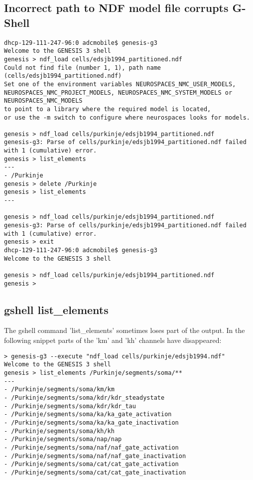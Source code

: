 \documentclass[12pt]{article}
\begin{document}
\subsection{Incorrect path to NDF model file corrupts G-Shell}
\begin{verbatim}
dhcp-129-111-247-96:0 adcmobile$ genesis-g3
Welcome to the GENESIS 3 shell
genesis > ndf_load cells/edsjb1994_partitioned.ndf
Could not find file (number 1, 1), path name (cells/edsjb1994_partitioned.ndf)
Set one of the environment variables NEUROSPACES_NMC_USER_MODELS,
NEUROSPACES_NMC_PROJECT_MODELS, NEUROSPACES_NMC_SYSTEM_MODELS or NEUROSPACES_NMC_MODELS
to point to a library where the required model is located,
or use the -m switch to configure where neurospaces looks for models.

genesis > ndf_load cells/purkinje/edsjb1994_partitioned.ndf
genesis-g3: Parse of cells/purkinje/edsjb1994_partitioned.ndf failed with 1 (cumulative) error.
genesis > list_elements
---
- /Purkinje
genesis > delete /Purkinje
genesis > list_elements
---

genesis > ndf_load cells/purkinje/edsjb1994_partitioned.ndf
genesis-g3: Parse of cells/purkinje/edsjb1994_partitioned.ndf failed with 1 (cumulative) error.
genesis > exit
dhcp-129-111-247-96:0 adcmobile$ genesis-g3
Welcome to the GENESIS 3 shell

genesis > ndf_load cells/purkinje/edsjb1994_partitioned.ndf
genesis >
\end{verbatim}


\subsection{gshell list\_elements}

The gshell command 'list\_elements' sometimes loses part of the
output.  In the following snippet parts of the 'km' and 'kh' channels
have disappeared:


\begin{verbatim}
> genesis-g3 --execute "ndf_load cells/purkinje/edsjb1994.ndf"
Welcome to the GENESIS 3 shell
genesis > list_elements /Purkinje/segments/soma/**
---
- /Purkinje/segments/soma/km/km
- /Purkinje/segments/soma/kdr/kdr_steadystate
- /Purkinje/segments/soma/kdr/kdr_tau
- /Purkinje/segments/soma/ka/ka_gate_activation
- /Purkinje/segments/soma/ka/ka_gate_inactivation
- /Purkinje/segments/soma/kh/kh
- /Purkinje/segments/soma/nap/nap
- /Purkinje/segments/soma/naf/naf_gate_activation
- /Purkinje/segments/soma/naf/naf_gate_inactivation
- /Purkinje/segments/soma/cat/cat_gate_activation
- /Purkinje/segments/soma/cat/cat_gate_inactivation
\end{verbatim}
\end{document}
